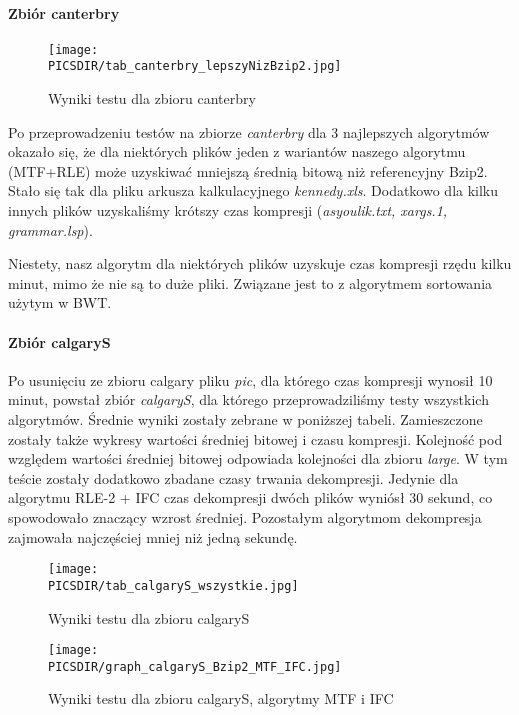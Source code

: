\paragraph{Zbiór canterbry}

\begin{figure}[phtb]
\texttt{[image: \\PICSDIR/tab\_canterbry\_lepszyNizBzip2.jpg]}
\caption{\label{fig:tab_canterbry_lepszyNizBzip2.jpg}Wyniki testu dla zbioru canterbry}
\end{figure}

Po przeprowadzeniu testów na zbiorze {\em canterbry} dla 3 najlepszych algorytmów okazało się, że dla niektórych plików jeden z wariantów naszego algorytmu (MTF+RLE) może uzyskiwać mniejszą średnią bitową niż referencyjny Bzip2. Stało się tak dla pliku arkusza kalkulacyjnego {\em kennedy.xls}. Dodatkowo dla kilku innych plików uzyskaliśmy krótszy czas kompresji ({\em asyoulik.txt, xargs.1, grammar.lsp}). 

Niestety, nasz algorytm dla niektórych plików uzyskuje czas kompresji rzędu kilku minut, mimo że nie są to duże pliki. Związane jest to z algorytmem sortowania użytym w BWT.

\paragraph{Zbiór calgaryS}

Po usunięciu ze zbioru calgary pliku {\em pic}, dla którego czas kompresji wynosił 10 minut, powstał zbiór {\em calgaryS}, dla którego przeprowadziliśmy testy wszystkich algorytmów. Średnie wyniki zostały zebrane w poniższej tabeli. Zamieszczone zostały także wykresy wartości średniej bitowej i czasu kompresji. Kolejność pod względem wartości średniej bitowej odpowiada kolejności dla zbioru {\em large}. W tym teście zostały dodatkowo zbadane czasy trwania dekompresji. Jedynie dla algorytmu RLE-2 + IFC czas dekompresji dwóch plików wyniósł 30 sekund, co spowodowało znaczący wzrost średniej. Pozostałym algorytmom dekompresja zajmowała najczęściej mniej niż jedną sekundę.

\begin{figure}[phtb]
\texttt{[image: \\PICSDIR/tab\_calgaryS\_wszystkie.jpg]}
\caption{\label{fig:tab_calgaryS_wszystkie.jpg}Wyniki testu dla zbioru calgaryS}
\end{figure}

\begin{figure}[phtb]
\texttt{[image: \\PICSDIR/graph\_calgaryS\_Bzip2\_MTF\_IFC.jpg]}
\caption{\label{fig:graph_calgaryS_Bzip2_MTF_IFC.jpg}Wyniki testu dla zbioru calgaryS, algorytmy MTF i IFC}
\end{figure}

